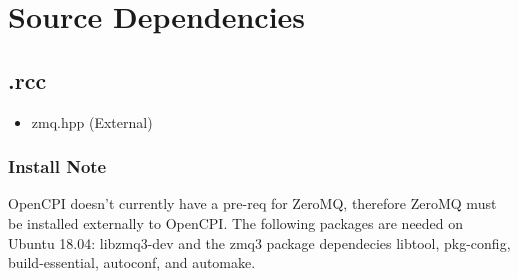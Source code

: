\section*{Source Dependencies}
	\subsection*{\comp.rcc}
	    \begin{itemize}
	    \item zmq.hpp (External)
	    \end{itemize}
	 \subsubsection*{Install Note}
        OpenCPI doesn't currently have a pre-req for ZeroMQ, therefore ZeroMQ must be installed externally to OpenCPI. The following packages are needed on Ubuntu 18.04: libzmq3-dev and the zmq3 package dependecies libtool, pkg-config, build-essential, autoconf, and automake. 

		


